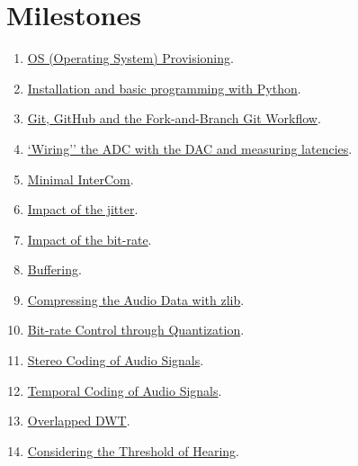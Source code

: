 \section{Milestones}
\begin{enumerate}
\item \href{https://tecnologias-multimedia.github.io/study_guide/01-provisioning/}{OS (Operating System) Provisioning}.
\item \href{https://tecnologias-multimedia.github.io/study_guide/02-python/}{Installation and basic programming with Python}.
\item \href{https://tecnologias-multimedia.github.io/study_guide/03-git/}{Git, GitHub and the Fork-and-Branch Git Workflow}.
\item \href{https://tecnologias-multimedia.github.io/study_guide/04-wiring/}{`Wiring'' the ADC with the DAC and measuring latencies}.
\item \href{https://tecnologias-multimedia.github.io/study_guide/05-minimal/}{Minimal InterCom}.
\item \href{https://tecnologias-multimedia.github.io/study_guide/06-jitter_impact/}{Impact of the jitter}.
\item \href{https://tecnologias-multimedia.github.io/study_guide/07-bit-rate_impact/}{Impact of the bit-rate}.
\item \href{https://tecnologias-multimedia.github.io/study_guide/08-buffer/}{Buffering}.
\item \href{https://tecnologias-multimedia.github.io/study_guide/09-compress/}{Compressing the Audio Data with zlib}.
\item \href{https://tecnologias-multimedia.github.io/study_guide/10-bt_control/}{Bit-rate Control through Quantization}.
\item \href{https://tecnologias-multimedia.github.io/study_guide/11-stereo_coding/}{Stereo Coding of Audio Signals}.
\item \href{https://tecnologias-multimedia.github.io/study_guide/12-temporal_coding/}{Temporal Coding of Audio Signals}.
\item \href{https://tecnologias-multimedia.github.io/study_guide/13-overlapped_temporal_coding/}{Overlapped DWT}.
\item \href{https://tecnologias-multimedia.github.io/study_guide/14-threshold/}{Considering the Threshold of Hearing}.
\end{enumerate}

